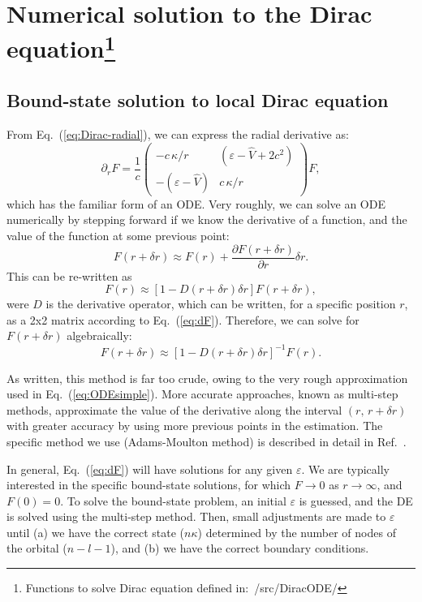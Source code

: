 \documentclass[10pt,twocolumn,a4paper]{article}%
\newcommand{\matr}[4]{\ensuremath{\begin{pmatrix}#1&#2\\#3&#4\end{pmatrix}}}	%
\newcommand{\be}{\begin{equation}}
\newcommand{\ee}{\end{equation}}
\def\en{\ensuremath{\varepsilon}}
\def\p{\ensuremath{\partial}}
\renewcommand{\k}{\ensuremath{\kappa}}
\begin{document}
\section[Numerical solution to the Dirac equation]{Numerical solution to the Dirac equation\footnote{Functions to solve Dirac equation defined in:~/src/DiracODE/}}

\subsection{Bound-state solution to local Dirac equation}\label{sec:solveDirac}

From Eq.~(\ref{eq:Dirac-radial}), we can express the radial derivative as:
\be\label{eq:dF}
\p_r F  =\frac{1}{c} \matr 	{-c\,{\k}/{r}} 	{(\en - \hat V+2c^2)}  {-(\en - \hat V)} 	 {c\,{\k}/{r}}F,
\ee
which has the familiar form of an ODE.
Very roughly, we can solve an ODE numerically by stepping forward if we know the derivative of a function, and the value of the function at some previous point:
\be\label{eq:ODEsimple}
F(r+\delta r) \approx F(r) + \frac{\p F(r+\delta r)}{\p r}\delta r.
\ee
This can be re-written as
\[
F(r) \approx \left[1 - D(r+\delta r) \delta r\right]F(r+\delta r),
\]
were $D$ is the derivative operator, which can be written, for a specific position $r$, as a 2x2 matrix according to Eq.~(\ref{eq:dF}).
Therefore, we can solve for $ F(r+\delta r)$ algebraically:
\[
 F(r+\delta r) \approx \left[1 - D(r+\delta r) \delta r\right]^{-1} F(r) .
\]

As written, this method is far too crude, owing to the very rough approximation used in Eq.~(\ref{eq:ODEsimple}).
More accurate approaches, known as multi-step methods, approximate the value of the derivative along the interval $(r, \, r+\delta r)$ with greater accuracy by using more previous points in the estimation.
The specific method we use (Adams-Moulton method)
 is described in detail in Ref.~\cite{JohnsonBook2007}.



In general, Eq.~(\ref{eq:dF}) will have solutions for any given $\en$.
We are typically interested in the specific bound-state solutions, for which $F\to0$ as $r\to\infty$, and $F(0)=0$.
To solve the bound-state problem, an initial $\en$ is guessed, and the DE is solved using the multi-step method.
Then, small adjustments are made to $\en$ until (a) we have the correct state ($n\k$) determined by the number of nodes of the orbital ($n-l-1$), and (b) we have the correct boundary conditions.
\end{document}
